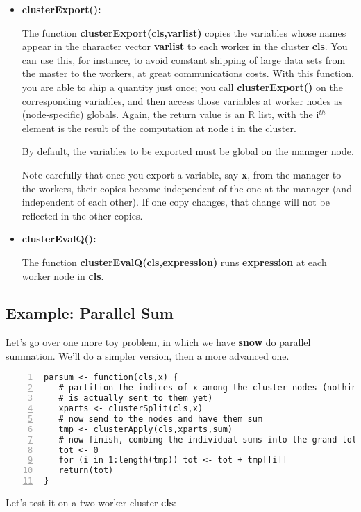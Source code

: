 \begin{itemize}
\item {\bf clusterExport():}

The function {\bf clusterExport(cls,varlist)} copies the variables whose
names appear in the character vector {\bf varlist} to each worker in the
cluster {\bf cls}.  You can use this, for instance, to avoid constant
shipping of large data sets from the master to the workers, at great
communications costs.  With this function, you are able to ship a
quantity just once; you call {\bf clusterExport()} on the corresponding
variables, and then access those variables at worker nodes as
(node-specific) globals.  Again, the return value is an R list, with the
i$^{th}$ element is the result of the computation at node i in the
cluster.

By default, the variables to be exported must be global on the manager
node.

Note carefully that once you export a variable, say {\bf x}, from the
manager to the workers, their copies become independent of the one at
the manager (and independent of each other).  If one copy changes, that
change will not be reflected in the other copies.

\item {\bf clusterEvalQ():}

The function {\bf clusterEvalQ(cls,expression)} runs {\bf
expression} at each worker node in {\bf cls}.  

\end{itemize}

\subsection{Example:  Parallel Sum}

Let's go over one more toy problem, in which we have {\bf snow} do
parallel summation.  We'll do a simpler version, then a more advanced
one.

\begin{lstlisting}[numbers=left]
parsum <- function(cls,x) {
   # partition the indices of x among the cluster nodes (nothing 
   # is actually sent to them yet)
   xparts <- clusterSplit(cls,x)
   # now send to the nodes and have them sum
   tmp <- clusterApply(cls,xparts,sum)
   # now finish, combing the individual sums into the grand total
   tot <- 0
   for (i in 1:length(tmp)) tot <- tot + tmp[[i]]
   return(tot)
}
\end{lstlisting}

Let's test it on a two-worker cluster {\bf cls}:

